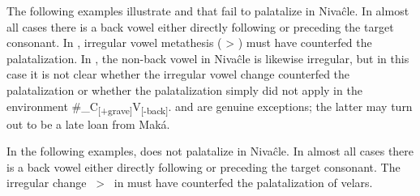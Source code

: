 \begin{exe}
    \ex \foodmn
    \ex \mouth
    \ex \cutdown
    \ex \rightn
    \ex \ameiva
    \ex \fieldn
    \ex \youngerbro
    \ex \wash
    \ex \bow \label{ni-sh-bow}
    \ex \languageword
    \ex \nose
    \ex \smelln
    \ex \pathn \label{ni-sh-pathn}
    \ex \leafmn
    \ex \thunder
    \ex \dig
    \ex \burrow
    \ex \saymn
    \ex \price
    \ex \night \label{ni-sh-night}
    \ex \egg
    \ex \headn
    \ex \jelayuk
    \ex \dirt
    \ex \spring \label{ni-sh-spring}
    \ex \tuscaf \label{ni-sh-tuscaf}
    \ex \tuscat \label{ni-sh-tuscat}
    \ex \tuscag \label{ni-sh-tuscag}
\end{exe}

The following examples illustrate  and  that fail to palatalize in Nivaĉle. In almost all cases there is a back vowel either directly following or preceding the target consonant. In , irregular vowel metathesis ( > ) must have counterfed the palatalization. In , the non-back vowel in Nivaĉle is likewise irregular, but in this case it is not clear whether the irregular vowel change counterfed the palatalization or whether the palatalization simply did not apply in the environment \#\_C\textsubscript{[+grave]}V\textsubscript{[-back]}.  and  are genuine exceptions; the latter may turn out to be a late loan from Maká.

\begin{exe}
    \ex \tobacco
    \ex \palm
    \ex \arrowfok
    \ex \hunger
    \ex \fry \label{ni-k-fry}
    \ex \testicle
    \ex \tail
    \ex \fall
    \ex \sunn
    \ex \answer
    \ex \runv
    \ex \grabwork
    \ex \eatkun
    \ex \heat
    \ex \meet
    \ex \sweat
    \ex \cactus \label{ni-k-cactus}
    \ex \leniosapl
    \ex \armadillonomaka \label{ni-k-armadillo}
    \ex \willow \label{ni-k-willow}
    \ex \yicalhuk
    \ex \powder
    \ex \feces
    \ex \zorzal
    \ex \wildmanioc
    \ex \rope
    \ex \fence
    \ex \distrust
    \ex \cat
    \ex \river
    \ex \face
    \ex \blind
    \ex \ant
    \ex \uncle
    \ex \duraznillo
    \ex \leniosasg
    \ex \badmood
    \ex \palosanto
    \ex \firewoodhuk
    \ex \paralytic
\end{exe}

In the following examples,  does not palatalize in Nivaĉle. In almost all cases there is a back vowel either directly following or preceding the target consonant. The irregular change ~>~ in  must have counterfed the palatalization of velars.

